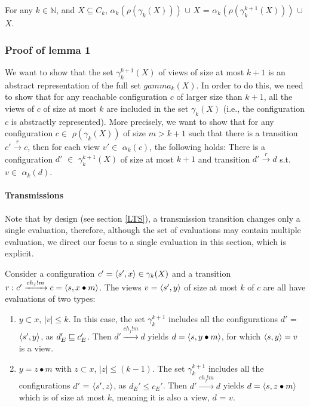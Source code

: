 \begin{lemma}
\label{lemma1}
For any $k\in\mathbb{N}$, and $X\subseteq C_k$, $\alpha_k(\rho(\gamma_k(X)))$ $\cup$ $X$ = $\alpha_k(\rho(\gamma_k^{k+1}(X)))$ $\cup$ $X$.
\end{lemma}

\subsubsection{Proof of lemma 1}
We want to show that the set $\gamma_k^{k+1}(X)$ of views of size at most $k+1$ is an abstract representation of the full set $gamma_k(X)$. In order to do this, we need to show that for any reachable configuration $c$ of larger size than $k+1$, all the views of $c$ of size at most $k$ are included in the set $\gamma_k(X)$ (i.e., the configuration $c$ is abstractly represented). More precisely, we want to show that for any configuration $c \in$ $\rho(\gamma_k(X))$ of size $m > k + 1$ such that there is a transition  $c' \xrightarrow{r} c$, then for each view $v' \in$ $\alpha_k(c)$, the following holds: There is a configuration $d'$ $\in$ $\gamma_k^{k+1}(X)$ of size at most $k+1$ and transition $ d' \xrightarrow{r} d$ s.t. $v \in$ $\alpha_k(d)$.

\paragraph{Transmissions}
\label{proofTransmission}
Note that by design (see section \ref{LTS}), a transmission transition changes only a single evaluation, therefore, although the set of evaluations may contain multiple evaluation, we direct our focus to a single evaluation in this section, which is explicit.

Consider a configuration $c' = \langle s', x\rangle \in \gamma_k(X)$ and a transition $r: c' \xrightarrow{ch_j!m} c = \langle s,x \bullet m\rangle$. The views $v = \langle s', y\rangle$ of size at most $k$ of $c$ are all have evaluations of two types:

\begin{enumerate}
\item
$y \subset x$, $|v| \leq k$. In this case, the set $\gamma_k^{k+1}$ includes all the configurations $d'$ = $\langle s', y\rangle$, as $d_E' \sqsubseteq c_E'$. Then $d' \xrightarrow{ch_j!m} d$ yields $d = \langle s, y\bullet m\rangle$, for which $\langle s, y\rangle = v$ is a view.
\item
$y = z\bullet m$ with $z \subset x$, $|z| \leq (k-1)$. The set $\gamma_k^{k+1}$ includes all the configurations $d'$ = $\langle s', z\rangle$, as $d_E' \leq c_E'$. Then $d' \xrightarrow{ch_j!m} d$ yields $d = \langle s, z\bullet m\rangle$ which is of size at most $k$, meaning it is also a view, $d$ = $v$.
\end{enumerate}


